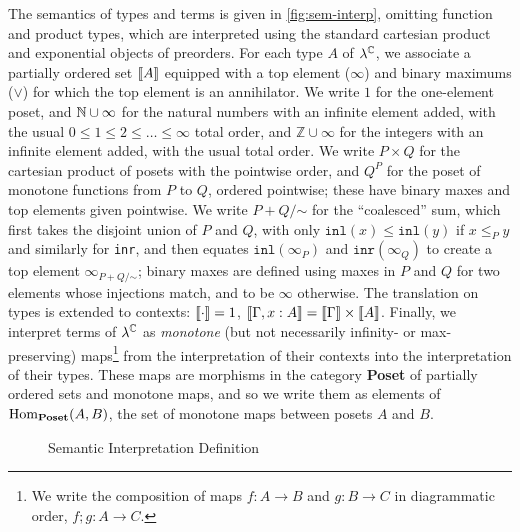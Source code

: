 The semantics of types and terms is given in
\autoref{fig:sem-interp}, omitting function and product types, which are interpreted using the standard cartesian product and exponential objects of preorders.  For each type $A$ of $\lambda^{\mathbb{C}}$, we
associate a partially ordered set $\llbracket A \rrbracket$ equipped with a top
element ($\infty$) and binary maximums ($\vee$) for which the top
element is an annihilator.
We write $1$ for the one-element poset, and $\mathbb{N} \cup \infty$ for the
natural numbers with an infinite element added, with the usual $0 \le 1
\le 2 \le \ldots \le \infty$ total order, and $\mathbb{Z} \cup \infty$
for the integers with an infinite element added, with the usual total
order.  We write $P \times Q$ for the cartesian product of posets with
the pointwise order, and $Q^P$ for the poset of monotone functions from
$P$ to $Q$, ordered pointwise; these have binary maxes and top elements
given pointwise.  We write $P + Q /\mathord\sim$ for the ``coalesced'' sum,
which first takes the disjoint union of $P$ and $Q$, with only
$\texttt{inl}(x) \le \texttt{inl}(y)$ if $x \le_P y$ and similarly for
\texttt{inr}, and then equates $\texttt{inl}(\infty_P)$ and
$\texttt{inr}(\infty_Q)$ to create a top element $\infty_{P+Q/\mathord\sim}$;
binary maxes are defined using maxes in $P$ and $Q$ for two elements
whose injections match, and to be $\infty$ otherwise.  The translation
on types is extended to contexts: $\llbracket \cdot \rrbracket = 1$,
$\llbracket \Gamma,x:A \rrbracket = \llbracket \Gamma \rrbracket \times \llbracket A \rrbracket$. Finally, we
interpret terms of $\lambda^{\mathbb{C}}$ as \textit{monotone} (but not
necessarily infinity- or max-preserving) maps\footnote{ We write the
  composition of maps $f : A \to B$ and $g : B \to C$ in diagrammatic
  order, $f ; g : A \to C$.  } from the interpretation of their contexts
into the interpretation of their types. These maps are morphisms in the category
\textbf{Poset} of partially ordered sets and monotone maps, and
so we write them as elements of $\operatorname{Hom}_{\textbf{Poset}}(A,B)$, the
set of monotone maps between posets $A$ and $B$.

\begin{figure}
  
  \caption{Semantic Interpretation Definition}
  \label{fig:sem-interp}
\end{figure}


